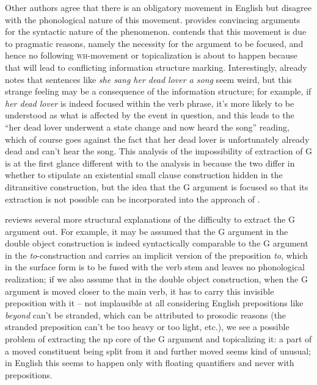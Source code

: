 \documentclass[UTF8, a4paper, oneside, scheme=plain, 12pt]{ctexbook}
\newcommand{\form}[1]{\emph{#1}}
\newcommand{\category}[1]{\textsc{#1}}
\begin{document}
Other authors agree that there is an obligatory movement in English
but disagree with the phonological nature of this movement.
\citet{julien2002syntax} provides convincing arguments for the syntactic nature of the phenomenon.
\citet{im2005alternative} contends that this movement is due to pragmatic reasons, 
namely the necessity for the argument to be focused,
and hence no following \category{wh}-movement or topicalization is about to happen 
because that will lead to conflicting information structure marking.
Interestingly, \citet{baker1997thematic} already notes that sentences like 
\form{she sang her dead lover a song} seem weird, 
but this strange feeling may be a consequence of the information structure;
for example, if \form{her dead lover} is indeed focused within the verb phrase, 
it's more likely to be understood as what is affected by the event in question, 
and this leads to the ``her dead lover underwent a state change and now heard the song'' reading, 
which of course goes against the fact that her dead lover is unfortunately already dead and can't hear the song.
This analysis of the impossibility of extraction of G is 
at the first glance different with to the analysis in \citet{oba2005double}
because the two differ in whether to stipulate an existential small clause construction hidden in the ditransitive construction,
but the idea that the G argument is focused so that its extraction is not possible 
can be incorporated into the approach of \citet{oba2005double}.

\citet{baker1997thematic} reviews several more structural explanations 
of the difficulty to extract the G argument out.
For example, it may be assumed that the G argument in the double object construction
is indeed syntactically comparable to the G argument in the \form{to}-construction and 
carries an implicit version of the preposition \form{to}, 
which in the surface form is to be fused with the verb stem 
and leaves no phonological realization; 
if we also assume that in the double object construction,
when the G argument is moved closer to the main verb, 
it has to carry this invisible preposition with it 
-- not implausible at all considering English prepositions like \form{beyond} can't be stranded, 
which can be attributed to prosodic reasons 
(the stranded preposition can't be too heavy or too light, etc.), 
we see a possible problem of extracting the \acs{np} core of the G argument and topicalizing it: 
a part of a moved constituent being split from it and further moved seems kind of unusual; 
in English this seems to happen only with floating quantifiers
and never with prepositions.
\end{document}
